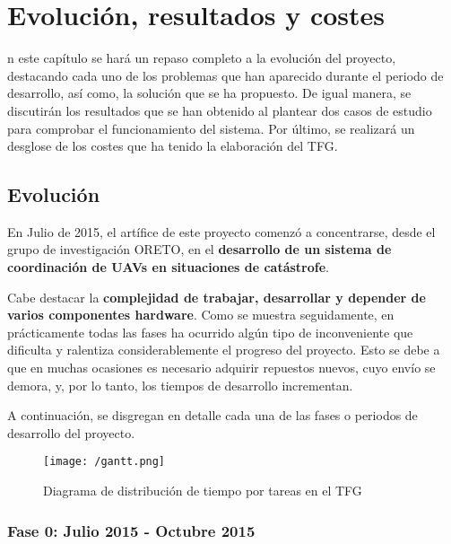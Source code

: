 \chapter{Evolución, resultados y costes}
\label{chap:resultados}

n este capítulo se hará un repaso completo a la evolución del proyecto, destacando cada uno de los problemas que han aparecido durante el periodo de desarrollo, así como, la solución que se ha propuesto. De igual manera, se discutirán los resultados que se han obtenido al plantear dos casos de estudio para comprobar el funcionamiento del sistema. Por último, se realizará un desglose de los costes que ha tenido la elaboración del \acs{TFG}.

\section{Evolución}
\label{sec:evolucion}

En Julio de 2015, el artífice de este proyecto comenzó a concentrarse, desde el grupo de investigación ORETO, en el \textbf{desarrollo de un sistema de coordinación de \acs{UAV}s en situaciones de catástrofe}.

Cabe destacar la \textbf{complejidad de trabajar, desarrollar y depender de varios componentes hardware}. Como se muestra seguidamente, en prácticamente todas las fases ha ocurrido algún tipo de inconveniente que dificulta y ralentiza considerablemente el progreso del proyecto. Esto se debe a que en muchas ocasiones es necesario adquirir repuestos nuevos, cuyo envío se demora, y, por lo tanto, los tiempos de desarrollo incrementan.

A continuación, se disgregan en detalle cada una de las fases o periodos de desarrollo del proyecto. 

\begin{figure}[!h]
\begin{center}
\texttt{[image: /gantt.png]}
\caption[Diagrama de distribución de tiempo por tareas en el \acs{TFG}]{Diagrama de distribución de tiempo por tareas en el \acs{TFG}}
\label{fig:gantt}
\end{center}
\end{figure}

\subsection{Fase 0: Julio 2015 - Octubre 2015}
\label{sec:primeraetapa}


